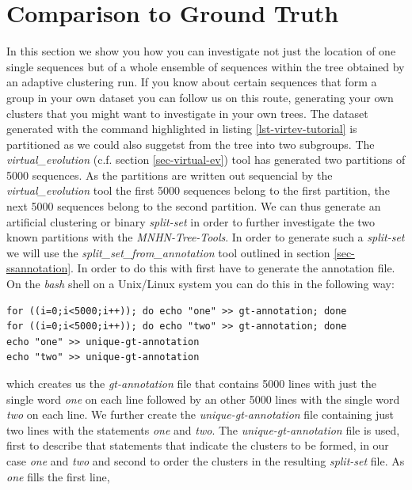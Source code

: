 \section{Comparison to Ground Truth}

In this section we show you how you can investigate not just the location
of one single sequences but of a whole ensemble of sequences within the tree
obtained by an adaptive clustering run. If you know about certain
sequences that form a group in your own dataset you can follow us on
this route, generating your own clusters that you might want to
investigate in your own trees. The dataset generated with the command
highlighted in listing \ref{lst-virtev-tutorial} is partitioned as we
could also suggetst from the tree into two subgroups. The
\emph{virtual\_evolution} (c.f. section \ref{sec-virtual-ev}) tool has
generated two partitions of 5000 sequences. As the partitions are
written out sequencial by the \emph{virtual\_evolution} tool the
first 5000 sequences belong to the first partition, the next 5000
sequences belong to the second partition. We can thus generate an
artificial clustering or binary \emph{split-set} in order to further
investigate the two known partitions with the \emph{MNHN-Tree-Tools}. In
order to generate such a \emph{split-set} we will use the
\emph{split\_set\_from\_annotation} tool outlined in section
\ref{sec-ssannotation}. In order to do this with first have to
generate the annotation file. On the \emph{bash} \cite{bash} shell on
a Unix/Linux system you can do this in the following way:
\begin{lstlisting}
for ((i=0;i<5000;i++)); do echo "one" >> gt-annotation; done
for ((i=0;i<5000;i++)); do echo "two" >> gt-annotation; done
echo "one" >> unique-gt-annotation
echo "two" >> unique-gt-annotation
\end{lstlisting}
which creates us the \emph{gt-annotation} file that contains 5000
lines with just the single word \emph{one} on each line followed by an
other 5000 lines with the single word \emph{two} on each line. We
further create the \emph{unique-gt-annotation} file containing just
two lines with the statements \emph{one} and \emph{two}. The
\emph{unique-gt-annotation} file is used, first to describe that
statements that indicate the clusters to be formed, in our case
\emph{one} and \emph{two} and second to order the clusters in the
resulting \emph{split-set} file. As \emph{one} fills the first line,

